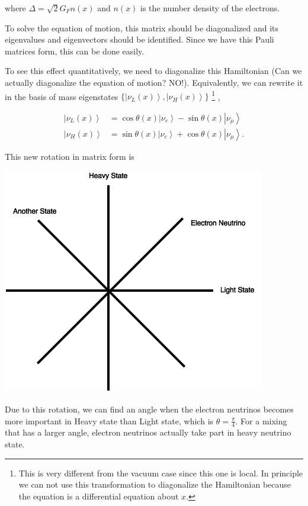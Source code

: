 \documentclass{tufte-handout}
\newcommand{\ket}[1]{\left| #1\right\rangle}
\begin{document}
where $\Delta = \sqrt{2} G_F n(x) $ and $n(x)$ is the number density of the electrons.

To solve the equation of motion, this matrix should be diagonalized and its eigenvalues and eigenvectors should be identified. Since we have this Pauli matrices form, this can be done easily.

To see this effect quantitatively, we need to diagonalize this Hamiltonian (Can we actually diagonalize the equation of motion? NO!). Equivalently, we can rewrite it in the basis of mass eigenstates  $\{\ket{\nu_L(x)}, \ket{\nu_H(x)}\}$ \footnote{This is very different from the vacuum case since this one is local. In principle we can not use this transformation to diagonalize the Hamiltonian because the equation is a differential equation about $x$.} , 

\begin{align*}
\ket{\nu_L(x)} &= \cos\theta(x) \ket{\nu_e} - \sin\theta(x) \ket{\nu_\mu} \\
\ket{\nu_H(x)} & =  \sin\theta(x) \ket{\nu_e} + \cos\theta(x) \ket{\nu_\mu}.
\end{align*}


This new rotation in matrix form is 

\begin{marginfigure}
\includegraphics{assets/heavyLightRotation}
\caption{Due to this rotation, we can find an angle when the electron neutrinos becomes more important in Heavy state than Light state, which is $\theta=\frac{\pi}{4}$. For a mixing that has a larger angle, electron neutrinos actually take part in heavy neutrino state.}
\end{marginfigure}
\end{document}
